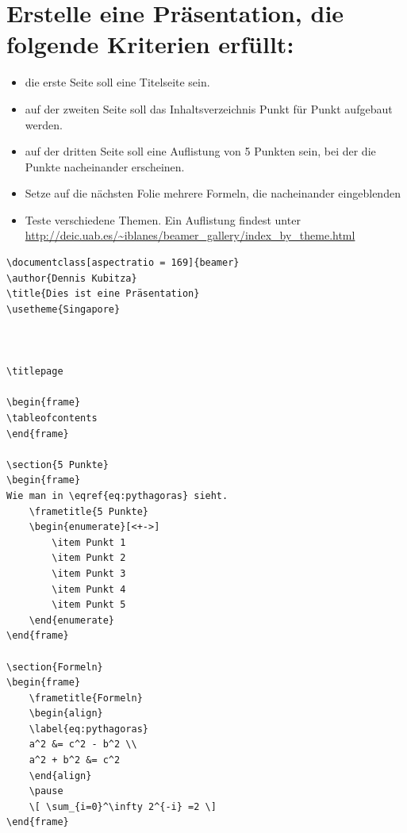 \section{Erstelle eine Präsentation, die folgende Kriterien erfüllt:}
\begin{itemize}
  \item die erste Seite soll eine Titelseite sein.
  \item auf der zweiten Seite soll das Inhaltsverzeichnis Punkt für Punkt aufgebaut werden.
  \item auf der dritten Seite soll eine Auflistung von 5 Punkten sein, bei der die Punkte nacheinander erscheinen.
  \item Setze auf die nächsten Folie mehrere Formeln, die nacheinander eingeblenden
  \item Teste verschiedene Themen. Ein Auflistung findest unter \\
  \url{http://deic.uab.es/~iblanes/beamer_gallery/index_by_theme.html}
\end{itemize}

\begin{Antwort}
\begin{lstlisting}[style=latex]
\documentclass[aspectratio = 169]{beamer}
\author{Dennis Kubitza}
\title{Dies ist eine Präsentation}
\usetheme{Singapore}



\titlepage

\begin{frame}
\tableofcontents
\end{frame}

\section{5 Punkte}
\begin{frame}
Wie man in \eqref{eq:pythagoras} sieht.
	\frametitle{5 Punkte}
	\begin{enumerate}[<+->]
		\item Punkt 1
		\item Punkt 2
		\item Punkt 3
		\item Punkt 4
		\item Punkt 5
	\end{enumerate}
\end{frame}

\section{Formeln}
\begin{frame}
	\frametitle{Formeln}
	\begin{align}
	\label{eq:pythagoras}
	a^2 &= c^2 - b^2 \\
	a^2 + b^2 &= c^2
	\end{align}
	\pause
	\[ \sum_{i=0}^\infty 2^{-i} =2 \]
\end{frame}



\end{lstlisting}
\end{Antwort}

